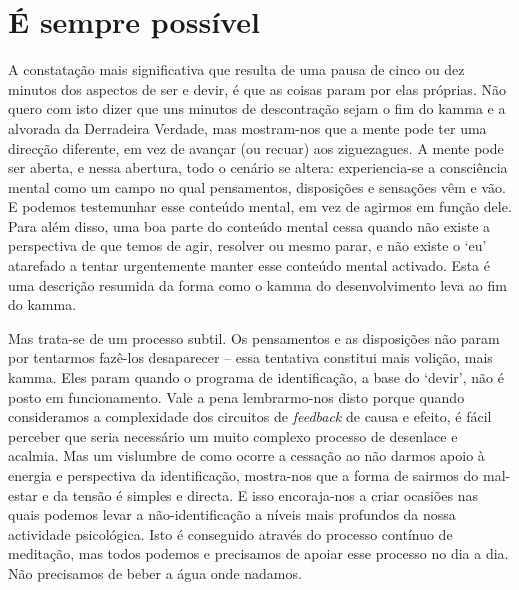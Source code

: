 \section{É sempre possível}

A constatação mais significativa que resulta de uma pausa de cinco ou dez
minutos dos aspectos de ser e devir, é que as coisas param por elas próprias.
Não quero com isto dizer que uns minutos de descontração sejam o fim do kamma e
a alvorada da Derradeira Verdade, mas mostram-nos que a mente pode ter uma
direcção diferente, em vez de avançar (ou recuar) aos ziguezagues. A mente pode
ser aberta, e nessa abertura, todo o cenário se altera: experiencia-se a
consciência mental como um campo no qual pensamentos, disposições e sensações
vêm e vão. E podemos testemunhar esse conteúdo mental, em vez de agirmos em
função dele. Para além disso, uma boa parte do conteúdo mental cessa quando não
existe a perspectiva de que temos de agir, resolver ou mesmo parar, e não existe
o `eu' atarefado a tentar urgentemente manter esse conteúdo mental
activado.
Esta é uma descrição resumida da forma como o kamma do desenvolvimento leva ao
fim do kamma.

Mas trata-se de um processo subtil. Os pensamentos e as disposições não param
por tentarmos fazê-los desaparecer -- essa tentativa constitui mais volição,
mais kamma. Eles param quando o programa de identificação, a base do `devir',
não é posto em funcionamento. Vale a pena lembrarmo-nos disto porque quando
consideramos a complexidade dos circuitos de \emph{feedback} de causa e efeito,
é fácil perceber que seria necessário um muito complexo processo de desenlace e
acalmia. Mas um vislumbre de como ocorre a cessação ao não darmos apoio à
energia e perspectiva da identificação, mostra-nos que a forma de sairmos do
mal-estar e da tensão é simples e directa. E isso encoraja-nos a criar ocasiões
nas quais podemos levar a não-identificação a níveis mais profundos da nossa
actividade psicológica. Isto é conseguido através do processo contínuo de
meditação, mas todos podemos e precisamos de apoiar esse processo no dia a dia.
Não precisamos de beber a água onde nadamos.

